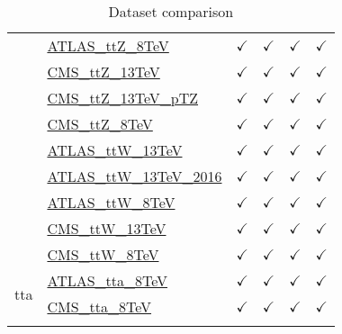 \documentclass{article}
\begin{document}
\begin{longtable}{|c|l|c|c|c|c|}
 & \href{https://arxiv.org}{ATLAS_ttZ_8TeV}  & $\checkmark$ & $\checkmark$ & $\checkmark$ & $\checkmark$\\ \cline{2-6}
 & \href{https://arxiv.org}{CMS_ttZ_13TeV}  & $\checkmark$ & $\checkmark$ & $\checkmark$ & $\checkmark$\\ \cline{2-6}
 & \href{https://arxiv.org}{CMS_ttZ_13TeV_pTZ}  & $\checkmark$ & $\checkmark$ & $\checkmark$ & $\checkmark$\\ \cline{2-6}
 & \href{https://arxiv.org}{CMS_ttZ_8TeV}  & $\checkmark$ & $\checkmark$ & $\checkmark$ & $\checkmark$\\ \cline{2-6}
 & \href{https://arxiv.org}{ATLAS_ttW_13TeV}  & $\checkmark$ & $\checkmark$ & $\checkmark$ & $\checkmark$\\ \cline{2-6}
 & \href{https://arxiv.org}{ATLAS_ttW_13TeV_2016}  & $\checkmark$ & $\checkmark$ & $\checkmark$ & $\checkmark$\\ \cline{2-6}
 & \href{https://arxiv.org}{ATLAS_ttW_8TeV}  & $\checkmark$ & $\checkmark$ & $\checkmark$ & $\checkmark$\\ \cline{2-6}
 & \href{https://arxiv.org}{CMS_ttW_13TeV}  & $\checkmark$ & $\checkmark$ & $\checkmark$ & $\checkmark$\\ \cline{2-6}
 & \href{https://arxiv.org}{CMS_ttW_8TeV}  & $\checkmark$ & $\checkmark$ & $\checkmark$ & $\checkmark$
\\ \hline
\multirow{2}{*}{tta}
 & \href{https://arxiv.org}{ATLAS_tta_8TeV}  & $\checkmark$ & $\checkmark$ & $\checkmark$ & $\checkmark$\\ \cline{2-6}
 & \href{https://arxiv.org}{CMS_tta_8TeV}  & $\checkmark$ & $\checkmark$ & $\checkmark$ & $\checkmark$
\\ \hline
\caption{Dataset comparison}
\end{longtable}
\end{document}
